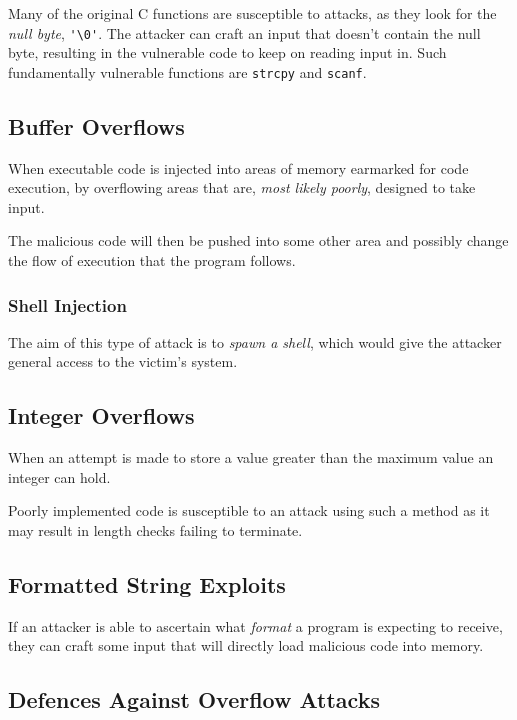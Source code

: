 \documentclass{article}
\begin{document}
Many of the original C functions are susceptible to attacks, as they look for the \textit{null byte}, \verb|'\0'|. The attacker can craft an input that doesn't contain the null byte, resulting in the vulnerable code to keep on reading input in. Such fundamentally vulnerable functions are \texttt{strcpy} and \texttt{scanf}.

\filbreak
\subsection{Buffer Overflows}

When executable code is injected into areas of memory earmarked for code execution, by overflowing areas that are, \textit{most likely poorly}, designed to take input.

The malicious code will then be pushed into some other area and possibly change the flow of execution that the program follows.

\subsubsection{Shell Injection}

The aim of this type of attack is to \textit{spawn a shell}, which would give the attacker general access to the victim's system.

\subsection{Integer Overflows}

When an attempt is made to store a value greater than the maximum value an integer can hold.

Poorly implemented code is susceptible to an attack using such a method as it may result in length checks failing to terminate.

\subsection{Formatted String Exploits}

If an attacker is able to ascertain what \textit{format} a program is expecting to receive, they can craft some input that will directly load malicious code into memory.

\subsection{Defences Against Overflow Attacks}
\end{document}
